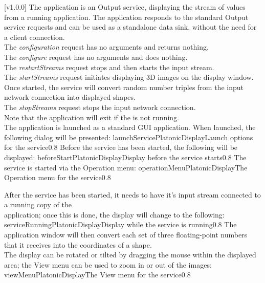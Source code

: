 [v1.0.0]
The  application is an Output service, displaying
the stream of values from a running  application.
The application responds to the standard Output service requests and can be used as a
standalone data sink, without the need for a client connection.\\

The \emph{configuration} request has no arguments and returns nothing.\\

The \emph{configure} request has no arguments and does nothing.\\

The \emph{restartStreams} request stops and then starts the input stream.\\

The \emph{startStreams} request initiates displaying 3D images on the display window.
Once started, the service will convert random number triples from the input \yarp{}
network connection into displayed shapes.\\

The \emph{stopStreams} request stops the input \yarp{} network connection.\\ 

Note that the application will exit if the \emph{\RS} is not running.\\

The  application is launched as a standard GUI
application.
When launched, the following dialog will be presented:
%
{launchServicePlatonicDisplay}{Launch options for the \emph{\PDO} service}{0.8}
\condPage{}
Before the service has been started, the following will be displayed:
%
{beforeStartPlatonicDisplay}{Display before the \emph{\PDO} service starts}{0.8}
\condPage{}
The service is started via the Operation menu:
%
{operationMenuPlatonicDisplay}{The Operation menu for the \emph{\PDO} service}{0.8}

After the service has been started, it needs to have it's input stream connected to a
running copy of the\\
 application;
once this is done, the display will change to the following:
%
{serviceRunningPlatonicDisplay}{Display while the \emph{\PDO} service is running}{0.8}
\condPage{}
The  application window will then convert each
set of three floating-point numbers that it receives into the coordinates of a shape.\\

The display can be rotated or tilted by dragging the mouse within the displayed area;
the View menu can be used to zoom in or out of the images:
%
{viewMenuPlatonicDisplay}{The View menu for the \emph{\PDO} service}{0.8}
\primaryEnd{}
